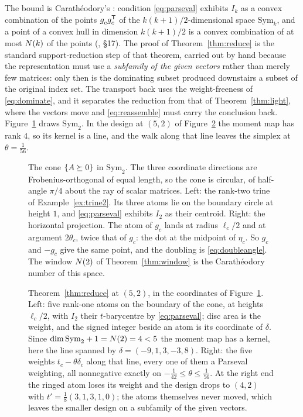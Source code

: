 The bound is Carath\'eodory's \cite{Caratheodory1911}: condition
\eqref{eq:parseval} exhibits $I_k$ as a convex combination of the points
$g_c^{\vphantom{\mathsf{T}}}g_c\tp$ of the $k(k+1)/2$-dimensional space
$\mathrm{Sym}_k$, and a point of a convex hull in dimension $k(k+1)/2$ is
a convex combination of at most $N(k)$ of the points
(\cite{Rockafellar1970}, \S17).  The proof of Theorem~\ref{thm:reduce} is
the standard support-reduction step of that theorem, carried out by hand
because the representation must use a \emph{subfamily of the given
vectors} rather than merely few matrices: only then is the dominating
subset produced downstairs a subset of the original index set.  The
transport back uses the weight-freeness of \eqref{eq:dominate}, and it
separates the reduction from that of Theorem~\ref{thm:light}, where the
vectors move and \eqref{eq:reassemble} must carry the conclusion back.
Figure~\ref{fig:psdcone} draws $\mathrm{Sym}_2$.  In the design at $(5,2)$ of
Figure~\ref{fig:crystal} the moment map has rank $4$, so its kernel is a
line, and the walk along that line leaves the simplex at $\theta=\tfrac1{56}$.

\begin{figure}[ht]
  \centering
  
  \caption{The cone $\{A\succeq0\}$ in $\mathrm{Sym}_2$.  The three coordinate
  directions are Frobenius-orthogonal of equal length, so the cone is circular,
  of half-angle $\pi/4$ about the ray of scalar matrices.  Left: the rank-two
  trine of Example~\ref{ex:trine2}.  Its three atoms lie on the boundary circle
  at height $1$, and \eqref{eq:parseval} exhibits $I_2$ as their centroid.
  Right: the horizontal projection.  The atom of $g_c$ lands at radius
  $\ell_c/2$ and at argument $2\theta_c$, twice that of $g_c$: the dot at the
  midpoint of $\eta_c$.  So $g_c$ and $-g_c$ give the same point, and the
  doubling is \eqref{eq:doubleangle}.  The window $N(2)$ of
  Theorem~\ref{thm:window} is the Carath\'eodory number of this space.}
  \label{fig:psdcone}
\end{figure}

\begin{figure}[ht]
  \centering
  
  \caption{Theorem~\ref{thm:reduce} at $(5,2)$, in the coordinates of
  Figure~\ref{fig:psdcone}.  Left: five rank-one atoms on the boundary of the
  cone, at heights $\ell_c/2$, with $I_2$ their $t$-barycentre by
  \eqref{eq:parseval}; disc area is the weight, and the signed integer beside
  an atom is its coordinate of $\delta$.  Since
  $\dim\mathrm{Sym}_2+1=N(2)=4<5$ the moment map has a kernel, here the
  line spanned by $\delta=(-9,1,3,-3,8)$.  Right: the five weights
  $t_c-\theta\delta_c$ along that line, every one of them a Parseval
  weighting, all nonnegative exactly on
  $-\tfrac1{42}\le\theta\le\tfrac1{56}$.  At the right end the ringed atom
  loses its weight and the design drops to $(4,2)$ with
  $t'=\tfrac18(3,1,3,1,0)$; the atoms themselves never moved, which leaves
  the smaller design on a subfamily of the given vectors.}
  \label{fig:crystal}
\end{figure}

